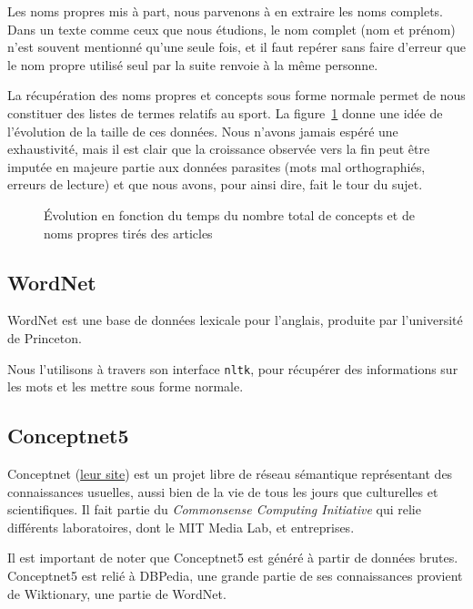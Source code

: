 \documentclass[a4paper, 12pt]{article}
\newcommand{\pyt}[1]{\texttt{#1}}%
\newcommand{\ang}[1]{\textit{#1}}%
\begin{document}
Les noms propres mis à part, nous parvenons à en extraire les noms complets. Dans un texte comme ceux que nous étudions, le nom complet (nom et prénom) n'est souvent mentionné qu'une seule fois, et il faut repérer sans faire d'erreur que le nom propre utilisé seul par la suite renvoie à la même personne.

La récupération des noms propres et concepts sous forme normale permet de nous constituer des listes de termes relatifs au sport. La figure~\ref{fig:conceptsnoms} donne une idée de l'évolution de la taille de ces données. Nous n'avons jamais espéré une exhaustivité, mais il est clair que la croissance observée vers la fin peut être imputée en majeure partie aux données parasites (mots mal orthographiés, erreurs de lecture) et que nous avons, pour ainsi dire, fait le tour du sujet.


\begin{figure}[h]
 \centering
 \caption{\label{fig:conceptsnoms}Évolution en fonction du temps du nombre total de concepts et de noms propres tirés des articles}
\end{figure}



\subsection{WordNet}

WordNet est une base de données lexicale pour l'anglais, produite par l'université de Princeton.

Nous l'utilisons à travers son interface \pyt{nltk}, pour récupérer des informations sur les mots et les mettre sous forme normale.


\subsection{Conceptnet5}

Conceptnet (\href{http://conceptnet5.media.mit.edu/}{leur site}) est un projet libre de réseau sémantique représentant des connaissances usuelles, aussi bien de la vie de tous les jours que culturelles et scientifiques. Il fait partie du \ang{Commonsense Computing Initiative} qui relie différents laboratoires, dont le MIT Media Lab, et entreprises.

Il est important de noter que Conceptnet5 est généré à partir de données brutes. Conceptnet5 est relié à DBPedia, une grande partie de ses connaissances provient de Wiktionary, une partie de WordNet.
\end{document}
